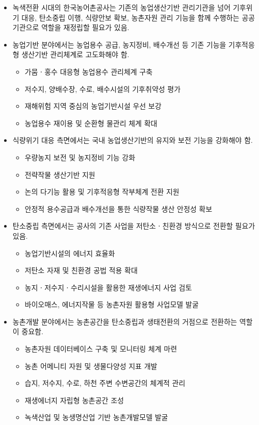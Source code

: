 \begin{itemize}
    \item 녹색전환 시대의 한국농어촌공사는 기존의 농업생산기반 관리기관을 넘어 기후위기 대응, 탄소중립 이행, 식량안보 확보, 농촌자원 관리 기능을 함께 수행하는 공공기관으로 역할을 재정립할 필요가 있음.

    \item 농업기반 분야에서는 농업용수 공급, 농지정비, 배수개선 등 기존 기능을 기후적응형 생산기반 관리체계로 고도화해야 함.
    \begin{itemize}
        \item 가뭄ㆍ홍수 대응형 농업용수 관리체계 구축
        \item 저수지, 양배수장, 수로, 배수시설의 기후취약성 평가
        \item 재해위험 지역 중심의 농업기반시설 우선 보강
        \item 농업용수 재이용 및 순환형 물관리 체계 확대
    \end{itemize}

    \item 식량위기 대응 측면에서는 국내 농업생산기반의 유지와 보전 기능을 강화해야 함.
    \begin{itemize}
        \item 우량농지 보전 및 농지정비 기능 강화
        \item 전략작물 생산기반 지원
        \item 논의 다기능 활용 및 기후적응형 작부체계 전환 지원
        \item 안정적 용수공급과 배수개선을 통한 식량작물 생산 안정성 확보
    \end{itemize}

    \item 탄소중립 측면에서는 공사의 기존 사업을 저탄소ㆍ친환경 방식으로 전환할 필요가 있음.
    \begin{itemize}
        \item 농업기반시설의 에너지 효율화
        \item 저탄소 자재 및 친환경 공법 적용 확대
        \item 농지ㆍ저수지ㆍ수리시설을 활용한 재생에너지 사업 검토
        \item 바이오매스, 에너지작물 등 농촌자원 활용형 사업모델 발굴
    \end{itemize}

    \item 농촌개발 분야에서는 농촌공간을 탄소중립과 생태전환의 거점으로 전환하는 역할이 중요함.
    \begin{itemize}
        \item 농촌자원 데이터베이스 구축 및 모니터링 체계 마련
        \item 농촌 어메니티 자원 및 생물다양성 지표 개발
        \item 습지, 저수지, 수로, 하천 주변 수변공간의 체계적 관리
        \item 재생에너지 자립형 농촌공간 조성
        \item 녹색산업 및 농생명산업 기반 농촌개발모델 발굴
    \end{itemize}


\end{itemize}
